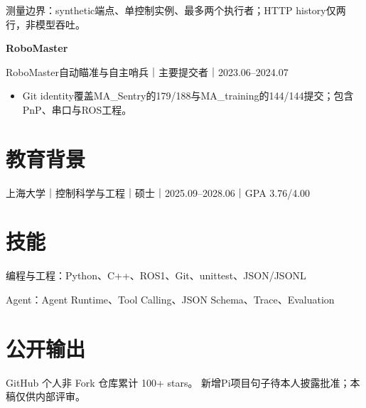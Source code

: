 \documentclass[10pt,a4paper,UTF8,fontset=fandol]{ctexart}
\begin{document}
{\color{muted}\fontsize{8.5}{10.4}\selectfont 测量边界：synthetic端点、单控制实例、最多两个执行者；HTTP history仅两行，非模型吞吐。\par}
\vspace{0.6em}
{\bfseries\color{navy}RoboMaster}\par
{\color{muted}\fontsize{8.8}{10.8}\selectfont RoboMaster自动瞄准与自主哨兵｜主要提交者｜2023.06--2024.07}\par
\begin{itemize}
\item Git identity覆盖MA\_Sentry的179/188与MA\_training的144/144提交；包含PnP、串口与ROS工程。
\end{itemize}
\vspace{0.6em}
\section{教育背景}
上海大学｜控制科学与工程｜硕士｜2025.09--2028.06｜GPA 3.76/4.00
\section{技能}
编程与工程：Python、C++、ROS1、Git、unittest、JSON/JSONL\par
Agent：Agent Runtime、Tool Calling、JSON Schema、Trace、Evaluation\par
\section{公开输出}
GitHub 个人非 Fork 仓库累计 100+ stars。
\vfill{\color{muted}\fontsize{8.5}{10}\selectfont 新增Pi项目句子待本人披露批准；本稿仅供内部评审。}
\end{document}
